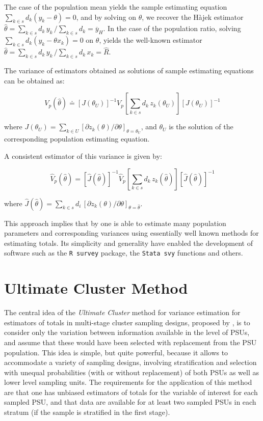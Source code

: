 \documentclass[
  12pt,
]{book}
\begin{document}
The case of the population mean yields the sample estimating equation \(\sum _{k \in s} d_k (y_k - \theta) = 0\), and by solving on \(\theta\), we recover the Hàjek estimator \(\widehat \theta = \sum _{k \in s} d_k \, y_k \, / \sum _{k \in s} d_k = \overline y_H\). In the case of the population ratio, solving \(\sum _{k \in s} d_k (y_k - \theta x_k) = 0\) on \(\theta\), yields the well-known estimator \(\widehat \theta = \sum _{k \in s} d_k \, y_k \, / \sum _{k \in s} d_k \, x_k = \widehat R\).

The variance of estimators obtained as solutions of sample estimating equations can be obtained as:

\[
V_p (\widehat \theta) \doteq \left[ J (\theta_U) \right] ^{-1} V_p \left[ \sum _{k \in s} d_k \, z_k (\theta_U) \right] \left[ J (\theta_U) \right] ^{-1}
\]

where \(J (\theta_U) = \sum _{k \in U} \left[ \partial{z_k (\theta)} / \partial \theta \right]_{\theta = \theta_U}\), and \(\theta_U\) is the solution of the corresponding population estimating equation.

A consistent estimator of this variance is given by:

\[
\widehat V_p (\widehat \theta) = \left[ \widehat J ( \widehat \theta) \right] ^{-1} \widehat V_p \left[ \sum _{k \in s} d_k \, z_k (\widehat \theta)\right] \left[ \widehat J ( \widehat \theta) \right] ^{-1}
\]

where \(\widehat J (\widehat \theta) = \sum _{k \in s} d_i \, \left[ \partial{z_k ( \theta)} / \partial \theta \right]_{\theta = \widehat \theta}\).

This approach implies that by one is able to estimate many population parameters and corresponding variances using essentially well known methods for estimating totals. Its simplicity and generality have enabled the development of software such as the \texttt{R\ survey} package, the \texttt{Stata\ svy} functions and others.

\hypertarget{ultimate-cluster-method}{%
\section{Ultimate Cluster Method}\label{ultimate-cluster-method}}

The central idea of the \emph{Ultimate Cluster} method for variance estimation for estimators of totals in multi-stage cluster sampling designs, proposed by \citep{Hansen1953}, is to consider only the variation between information available in the level of PSUs, and assume that these would have been selected with replacement from the PSU population. This idea is simple, but quite powerful, because it allows to accommodate a variety of sampling designs, involving stratification and selection with unequal probabilities (with or without replacement) of both PSUs as well as lower level sampling units. The requirements for the application of this method are that one has unbiased estimators of totals for the variable of interest for each sampled PSU, and that data are available for at least two sampled PSUs in each stratum (if the sample is stratified in the first stage).
\end{document}
